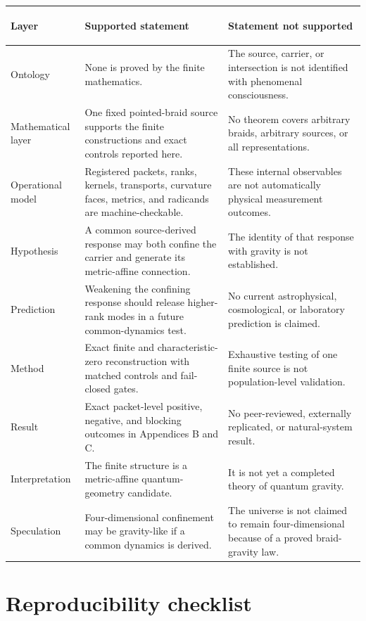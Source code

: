 \documentclass[12pt,a4paper,twoside]{article}
\begin{document}
\small
\begin{longtable}{>{\bfseries\raggedright\arraybackslash}p{}>{\raggedright\arraybackslash}p{}>{\raggedright\arraybackslash}p{}}
\toprule
Layer & Supported statement & Statement not supported \\
\midrule
\endhead
Ontology & None is proved by the finite mathematics. & The source, carrier, or intersection is not identified with phenomenal consciousness. \\
Mathematical layer & One fixed pointed-braid source supports the finite constructions and exact controls reported here. & No theorem covers arbitrary braids, arbitrary sources, or all representations. \\
Operational model & Registered packets, ranks, kernels, transports, curvature faces, metrics, and radicands are machine-checkable. & These internal observables are not automatically physical measurement outcomes. \\
Hypothesis & A common source-derived response may both confine the carrier and generate its metric-affine connection. & The identity of that response with gravity is not established. \\
Prediction & Weakening the confining response should release higher-rank modes in a future common-dynamics test. & No current astrophysical, cosmological, or laboratory prediction is claimed. \\
Method & Exact finite and characteristic-zero reconstruction with matched controls and fail-closed gates. & Exhaustive testing of one finite source is not population-level validation. \\
Result & Exact packet-level positive, negative, and blocking outcomes in Appendices B and C. & No peer-reviewed, externally replicated, or natural-system result. \\
Interpretation & The finite structure is a metric-affine quantum-geometry candidate. & It is not yet a completed theory of quantum gravity. \\
Speculation & Four-dimensional confinement may be gravity-like if a common dynamics is derived. & The universe is not claimed to remain four-dimensional because of a proved braid-gravity law. \\
\bottomrule
\end{longtable}
\normalsize

\section{Reproducibility checklist}
\end{document}
